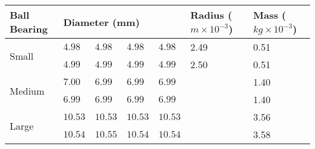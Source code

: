 \documentclass{article}
\begin{document}
\begin{center}

\begin{tabular}{|l|l|l|l|l|l|l|}
\hline
Ball Bearing            & \multicolumn{4}{l|}{Diameter (\si{mm})} & Radius ($\si{m} \times 10^{-3}$) & Mass ($\si{kg} \times 10^{-3}$)\\ \hline
\multirow{2}{*}{Small}  & $4.98$  & $4.98$  & $4.98$  & $4.98$  & 2.49 & 0.51 \\ \cline{2-7} 
                        & $4.99$  & $4.99$  & $4.99$  & $4.99$  & 2.50              & 0.51 \\ \hline
\multirow{2}{*}{Medium} & $7.00$  & $6.99$  & $6.99$  & $6.99$  &                   & 1.40 \\ \cline{2-7} 
                        & $6.99$  & $6.99$  & $6.99$  & $6.99$  &                   & 1.40 \\ \hline
\multirow{2}{*}{Large}  & $10.53$ & $10.53$ & $10.53$ & $10.53$ &                   & 3.56 \\ \cline{2-7} 
                        & $10.54$ & $10.55$ & $10.54$ & $10.54$ & & 3.58\\ \hline
\end{tabular}

\end{center}
\end{document}
